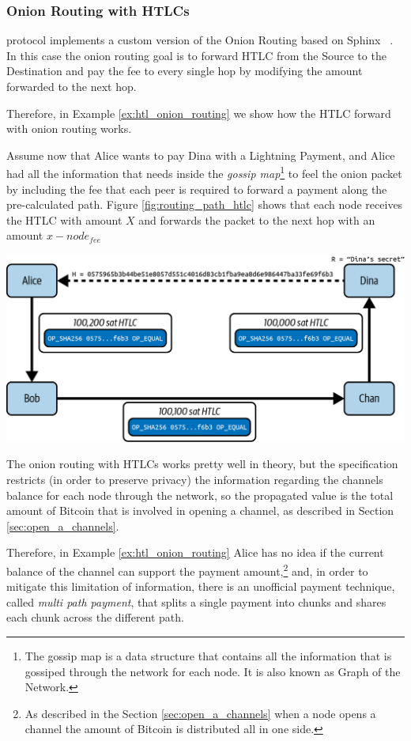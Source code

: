 \subsubsection{Onion Routing with HTLCs}

{\LN} protocol implements a custom version of the Onion Routing based on Sphinx ~\cite{cryptoeprint:2008/475}. In this case the onion routing goal is to forward HTLC from the Source to the Destination and pay the fee to
every single hop by modifying the amount forwarded to the next hop.

Therefore, in Example \ref{ex:htl_onion_routing} we show how the HTLC forward with onion routing works.

\begin{example}
  \label{ex:htl_onion_routing}
  Assume now that Alice wants to pay Dina with a Lightning Payment, and Alice had all the
  information that needs inside the \emph{gossip map}\footnote{The gossip map is a data structure that contains all the information that is gossiped through the network for each node. It is also known as Graph of the Network.} to feel the
  onion packet by including the fee that each peer is required to forward a payment
  along the pre-calculated path. Figure \ref{fig:routing_path_htlc} shows that each node receives the HTLC with
  amount $X$ and forwards the packet to the next hop with an amount $x - node_{fee}$

  {\centering
      \includegraphics[width=0.6\columnwidth]{imgs/mtln_1008.png}
  \par}  
\end{example}

The onion routing with HTLCs works pretty well in theory, but the {\LN} specification restricts (in order to preserve privacy) the information regarding
the channels balance for each node through the network, so the propagated value is the total amount of Bitcoin that is involved in opening a channel, as described in Section \ref{sec:open_a_channels}.

Therefore, in Example \ref{ex:htl_onion_routing} Alice has no idea if the current balance of the channel can support the payment amount,\footnote{As described in the Section \ref{sec:open_a_channels} when a node opens a channel the amount of Bitcoin is distributed all in one side.} and, in order to mitigate this limitation of information, there is an unofficial payment technique, called \emph{multi path payment}, that splits a single payment into chunks and shares each chunk across the different path.
